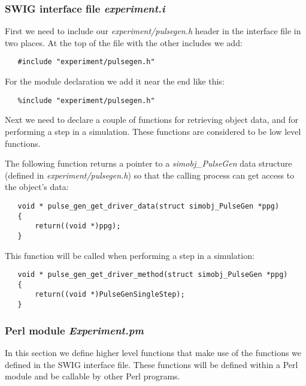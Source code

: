 \documentclass[12pt]{article}
\begin{document}
\subsubsection*{SWIG interface file {\it experiment.i}}

First we need to include our {\it experiment/pulsegen.h} header in the interface file in two places. At the top of the file with the other includes we add:
\begin{verbatim}
   #include "experiment/pulsegen.h"
\end{verbatim}
For the module declaration we add it near the end like this:
\begin{verbatim}
   %include "experiment/pulsegen.h"
\end{verbatim}
Next we need to declare a couple of functions for retrieving object data, and for performing a step in a simulation. These functions are considered to be low level functions.

The following function returns a pointer to a {\it simobj\_PulseGen{}} data structure (defined in {\it experiment/pulsegen.h}) so that the calling process can get access to the object's data:
\begin{verbatim}
   void * pulse_gen_get_driver_data(struct simobj_PulseGen *ppg)
   {
       return((void *)ppg);
   }
\end{verbatim}
This function will be called when performing a step in a simulation:
\begin{verbatim}
   void * pulse_gen_get_driver_method(struct simobj_PulseGen *ppg)
   {
       return((void *)PulseGenSingleStep);
   }
\end{verbatim}

\subsubsection*{Perl module {\it Experiment.pm}}

In this section we define higher level functions that make use of the functions we defined in the SWIG interface file. These functions will be defined within a Perl module and be callable by other Perl programs.
\end{document}
